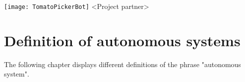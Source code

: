 \documentclass[%
oneside,    %
project,    %
nosummary   %
]{USN-MSc}
\newcommand{\myauthor}{%
223786 Lars Rikard Rådstoga
}
\newcommand{\myparticipants}{
<First participant>\\
<Second participant>\\
<Third participant>\\
<Fourth participant>
}
\begin{document}
\USNtitlepage%
{%
  {\normalsize}
   \texttt{[image: TomatoPickerBot]}}
{<Project partner>}
{%
\lipsum[6-7]
}





\tableofcontents
{}





\chapter{Definition of autonomous systems}
\label{ch:definition}
The following chapter displays different definitions of the phrase "autonomous system".
\end{document}
